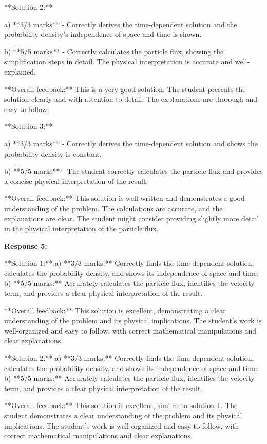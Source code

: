 \documentclass[a4paper,11pt]{article}
\begin{document}
**Solution 2:**

a) **3/3 marks** - Correctly derives the time-dependent solution and the probability density's independence of space and time is shown.

b) **5/5 marks** - Correctly calculates the particle flux, showing the simplification steps in detail. The physical interpretation is accurate and well-explained.

**Overall feedback:** This is a very good solution. The student presents the solution clearly and with attention to detail. The explanations are thorough and easy to follow.

**Solution 3:**

a) **3/3 marks** - Correctly derives the time-dependent solution and shows the probability density is constant.

b) **5/5 marks** - The student correctly calculates the particle flux and provides a concise physical interpretation of the result.

**Overall feedback:** This solution is well-written and demonstrates a good understanding of the problem. The calculations are accurate, and the explanations are clear. The student might consider providing slightly more detail in the physical interpretation of the particle flux.


\textbf{Response 5:}

**Solution 1:**
a) **3/3 marks:** Correctly finds the time-dependent solution, calculates the probability density, and shows its independence of space and time.
b) **5/5 marks:** Accurately calculates the particle flux, identifies the velocity term, and provides a clear physical interpretation of the result.

**Overall feedback:** This solution is excellent, demonstrating a clear understanding of the problem and its physical implications. The student's work is well-organized and easy to follow, with correct mathematical manipulations and clear explanations.

**Solution 2:**
a) **3/3 marks:** Correctly finds the time-dependent solution, calculates the probability density, and shows its independence of space and time.
b) **5/5 marks:** Accurately calculates the particle flux, identifies the velocity term, and provides a clear physical interpretation of the result.

**Overall feedback:** This solution is excellent, similar to solution 1. The student demonstrates a clear understanding of the problem and its physical implications. The student's work is well-organized and easy to follow, with correct mathematical manipulations and clear explanations.
\end{document}
